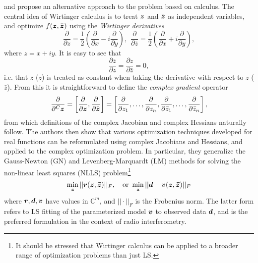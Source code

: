\documentclass[useAMS,usenatbib]{mn2e}
\newcommand{\COMPLEX}{\mathbb{C}}
\newcommand{\zz}{\bmath{z}}
\newcommand{\zzc}{\bmath{\bar z}}
\numberwithin{equation}{section}
\begin{document}
\citet{CR-Calculus} and \citet{ComplexOpt} propose an alternative approach to the problem based on \citet{WirtingerDeriv} calculus. 
The central idea of Wirtinger calculus is to treat $\zz$ and $\bar{\zz}$ as independent variables, and optimize $f(\zz,\bar{\zz})$
using the {\em Wirtinger derivatives} 
\begin{equation}
\frac{\partial}{\partial z} = \frac{1}{2}\left ( \frac{\partial}{\partial x} - i\frac{\partial}{\partial y} \right),~~
\frac{\partial}{\partial \bar{z}} = \frac{1}{2}\left ( \frac{\partial}{\partial x} + i\frac{\partial}{\partial y} \right),
\end{equation}
where $z=x+iy$. It is easy to see that  
\begin{equation}
\frac{\partial \bar z}{\partial z} = 
\frac{\partial z}{\partial \bar z} = 0,
\end{equation}
i.e. that $\bar z$ ($z$) is treated as constant when taking the derivative with respect to $z$ ($\bar z$). From this 
it is straightforward to define the \emph{complex gradient} operator 
\begin{equation}
\frac{\partial}{\partial^C \zz} = \left [ \frac{\partial}{\partial \zz}, \frac{\partial}{\partial \bar{\zz}} \right ] = \left [ \frac{\partial}{\partial z_1}, \dots, \frac{\partial}{\partial z_n},
\frac{\partial}{\partial \bar{z}_1}, \dots, \frac{\partial}{\partial \bar{z}_n} \right ],
\end{equation}
from which definitions of the complex Jacobian and complex Hessians naturally follow. The authors then show 
that various optimization techniques developed for real functions can be reformulated using 
complex Jacobians and Hessians, and applied to the complex optimization problem. In particular, they generalize 
the Gauss-Newton (GN) and Levenberg-Marquardt (LM) methods for solving the non-linear least squares (NLLS) 
problem\footnote{It should be stressed that Wirtinger calculus can be applied to a broader range of 
optimization problems than just LS.}
\begin{equation}
\label{eq:LSmin}
\min_{\bmath{z}} ||\bmath{r}(\zz,\zzc)||_F,~~~\mathrm{or}~\min_{\bmath{z}} ||\bmath{d}-\bmath{v}(\zz,\zzc)||_F
\end{equation}
where $\bmath{r},\bmath{d},\bmath{v}$ have values in $\COMPLEX^m$, and $||\cdot||_F$ is the Frobenius norm. The latter form 
refers to LS fitting of the parameterized model $\bmath{v}$ to observed data $\bmath{d}$, and is the preferred formulation
in the context of radio interferometry.
\end{document}
